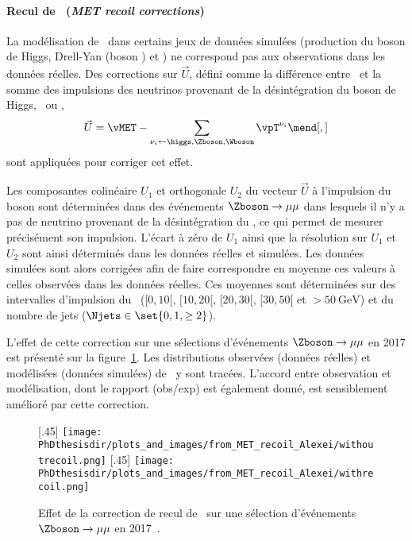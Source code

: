 \paragraph{Recul de \MET\ (\emph{MET recoil corrections})}
La modélisation de \MET\ dans certains jeux de données simulées (production du boson de Higgs, Drell-Yan (boson \Zboson) et \Wjets) ne correspond pas aux observations dans les données réelles.
Des corrections sur $\vec{U}$, défini comme la différence entre \MET\ et la somme des impulsions des neutrinos provenant de la désintégration du boson de Higgs, \Zboson\ ou \Wboson, \ie
\begin{equation}
\vec{U} = \vMET - \sum_{\nu_i \leftarrow \higgs,\Zboson,\Wboson} \vpT^{\nu_i}
\mend[,]
\end{equation}
sont appliquées pour corriger cet effet.
\par
Les composantes colinéaire $U_1$ et orthogonale $U_2$ du vecteur $\vec{U}$ à l'impulsion du boson sont déterminées dans des événements $\Zboson\to\mu\mu$ dans lesquels il n'y a pas de neutrino provenant de la désintégration du \Zboson, ce qui permet de mesurer précisément son impulsion.
L'écart à zéro de $U_1$ ainsi que la résolution sur $U_1$ et $U_2$ sont ainsi déterminés dans les données réelles et simulées.
Les données simulées sont alors corrigées afin de faire correspondre en moyenne ces valeurs à celles observées dans les données réelles.
Ces moyennes sont déterminées sur des intervalles d'impulsion du \Zboson\ ($[\num{0}, \num{10}[$, $[\num{10}, \num{20}[$, $[\num{20}, \num{30}[$, $[\num{30}, \num{50}[$ et $>\SI{50}{\GeV}$) et du nombre de jets ($\Njets\in\set{0, 1, \geq2}$).
\par
L'effet de cette correction sur une sélections d'événements $\Zboson\to\mu\mu$ en 2017 est présenté sur la figure~\ref{fig-MET_recoil_Alexei}.
Les distributions observées (données réelles) et modélisées (données simulées) de \MET\ y sont tracées.
L'accord entre observation et modélisation, dont le rapport (obs/exp) est également donné, est sensiblement amélioré par cette correction.
\begin{figure}[h]
\centering

[.45\textwidth]
{\texttt{[image: \\PhDthesisdir/plots\_and\_images/from\_MET\_recoil\_Alexei/withoutrecoil.png]}}
\hfill
{}[.45\textwidth]
{\texttt{[image: \\PhDthesisdir/plots\_and\_images/from\_MET\_recoil\_Alexei/withrecoil.png]}}

\caption[Effet de la correction de recul de \MET.]{Effet de la correction de recul de \MET\ sur une sélection d'événements $\Zboson\to\mu\mu$ en 2017~\cite{MET_recoil_Alexei}.}
\label{fig-MET_recoil_Alexei}
\end{figure}